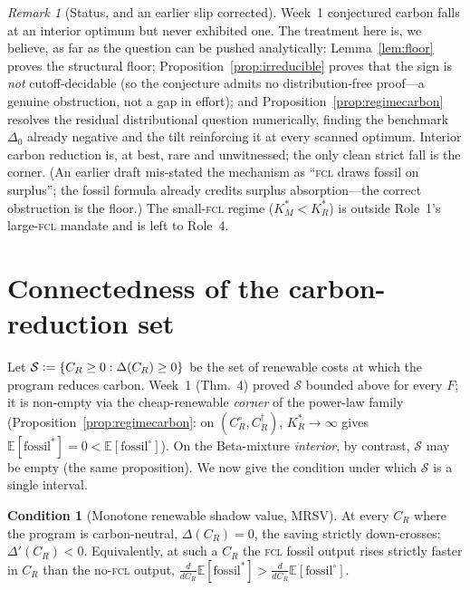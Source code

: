 \documentclass[11pt,reqno]{amsart}
\theoremstyle{plain}
\theoremstyle{definition}
\newtheorem{condition}{Condition}
\theoremstyle{remark}
\newtheorem{remark}{Remark}
\newcommand{\KRs}{K_R^{*}}
\newcommand{\KMs}{K_M^{*}}
\newcommand{\CR}{C_R}
\newcommand{\E}{\mathbb{E}}
\newcommand{\eqdef}{\vcentcolon=}
\begin{document}
\begin{remark}[Status, and an earlier slip corrected]
Week~1 conjectured carbon falls at an interior optimum but never exhibited one. The
treatment here is, we believe, as far as the question can be pushed analytically:
Lemma~\ref{lem:floor} proves the structural floor;
Proposition~\ref{prop:irreducible} proves that the sign is \emph{not} cutoff-decidable
(so the conjecture admits no distribution-free proof---a genuine obstruction, not a
gap in effort); and Proposition~\ref{prop:regimecarbon} resolves the residual
distributional question numerically, finding the benchmark $\Delta_0$ already
negative and the tilt reinforcing it at every scanned optimum. Interior carbon
reduction is, at best, rare and unwitnessed; the only clean strict fall is the
corner. (An earlier draft mis-stated the mechanism as ``\textsc{fcl} draws fossil on
surplus''; the fossil formula already credits surplus absorption---the correct
obstruction is the floor.) The small-\textsc{fcl} regime ($\KMs<\KRs$) is outside
Role~1's large-\textsc{fcl} mandate and is left to Role~4.
\end{remark}

\section{Connectedness of the carbon-reduction set}\label{sec:connected}

Let $\mathcal S\eqdef\{\CR\ge0:\Delta(\CR)\ge0\}$ be the set of renewable costs at
which the program reduces carbon. Week~1 (Thm.~4) proved $\mathcal S$ bounded above
for every $F$; it is non-empty via the cheap-renewable \emph{corner} of the
power-law family (Proposition~\ref{prop:regimecarbon}: on $(\CR^{\circ},\CR^{\dagger})$,
$\KRs\to\infty$ gives $\E[\text{fossil}^{*}]=0<\E[\text{fossil}^{\circ}]$). On the
Beta-mixture \emph{interior}, by contrast, $\mathcal S$ may be empty (the same
proposition). We now give the condition under which $\mathcal S$ is a single
interval.

\begin{condition}[Monotone renewable shadow value, MRSV]\label{cond:mrsv}
At every $\CR$ where the program is carbon-neutral, $\Delta(\CR)=0$, the saving
strictly down-crosses: $\Delta'(\CR)<0$. Equivalently, at such a $\CR$ the
\textsc{fcl} fossil output rises strictly faster in $\CR$ than the
no-\textsc{fcl} output,
$\frac{d}{d\CR}\E[\text{fossil}^{*}]>\frac{d}{d\CR}\E[\text{fossil}^{\circ}]$.
\end{condition}
\end{document}
